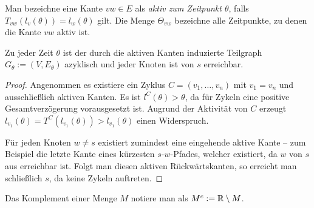 \begin{definition}
	Man bezeichne eine Kante $vw\in E$ als \emph{aktiv zum Zeitpunkt $\theta$}, falls $T_{vw}(l_v(\theta)) = l_w(\theta)$ gilt.
	Die Menge $\Theta_{vw}$ bezeichne alle Zeitpunkte, zu denen die Kante $vw$ aktiv ist.
\end{definition}

\begin{lemma}\label{lemma-shortest-path-using-active-edges}
	Zu jeder Zeit $\theta$ ist der durch die aktiven Kanten induzierte Teilgraph $G_\theta:=(V, E_\theta)$ azyklisch und jeder Knoten ist von $s$ erreichbar.
\end{lemma}
\begin{proof}
	Angenommen es existiere ein Zyklus $C=(v_1, \dots, v_n)$ mit $v_1=v_n$ und ausschließlich aktiven Kanten.
	Es ist $l^C(\theta) > \theta$, da für Zykeln eine positive Gesamtverzögerung vorausgesetzt ist.
	Augrund der Aktivität von $C$ erzeugt $l_{v_1}(\theta) = T^C(l_{v_1}(\theta)) > l_{v_1}(\theta)$ einen Widerspruch.
	
	Für jeden Knoten $w\neq s$ existiert zumindest eine eingehende aktive Kante -- zum Beispiel die letzte Kante eines kürzesten $s$-$w$-Pfades, welcher existiert, da $w$ von $s$ aus erreichbar ist.
	Folgt man diesen aktiven Rückwärtskanten, so erreicht man schließlich $s$, da keine Zykeln auftreten.
\end{proof}

\begin{notation}
	Das Komplement einer Menge $M$ notiere man als $M^c:= \mathbb{R}\setminus M$.
\end{notation}

